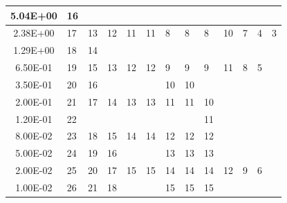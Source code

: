 \documentclass[11pt,letterpaper]{article}
\begin{document}
\begin{table}[htbp!]
\begin{tabular}{c|l|l|l|l|l|l|l|l|l|l|l|l}
  5.04E+00            & 16    &      &      &     &     &     &     &       &     &    &    &   \\ \hline
  2.38E+00            & 17    & 13   & 12   & 11  & 11  & 8   & 8   & 8     & 10  & 7  & 4  & 3 \\ \cline{1-3}
  1.29E+00            & 18    & 14   &      &     &     &     &     &       &     &    &    &   \\ \cline{1-12} 
  6.50E-01            & 19    & 15   & 13   & 12  & 12  & 9   & 9   & 9     & 11  & 8  & 5  &   \\ \cline{1-3} \cline{7-8}
  3.50E-01            & 20    & 16   &      &     &     & 10  & 10  &       &     &    &    &   \\ \cline{1-9}
  2.00E-01            & 21    & 17   & 14   & 13  & 13  & 11  & 11  & 10    &     &    &    &   \\ \cline{1-2} \cline{9-9}
  1.20E-01            & 22    &      &      &     &     &     &     & 11    &     &    &    &   \\ \cline{1-9} 
  8.00E-02            & 23    & 18   & 15   & 14  & 14  & 12  & 12  & 12    &     &    &    &   \\ \cline{1-4} \cline{7-9}
  5.00E-02            & 24    & 19   & 16   &     &     & 13  & 13  & 13    &     &    &    &   \\ \hline
  2.00E-02            & 25    & 20   & 17   & 15  & 15  & 14  & 14  & 14    & 12  & 9  & 6  &   \\ \cline{1-4} \cline{7-9}
  1.00E-02            & 26    & 21   & 18   &     &     & 15  & 15  & 15    &     &    &    &   \\
  \bottomrule
  \end{tabular}
  \label{tab:energygroups}
\end{table}
\end{document}
